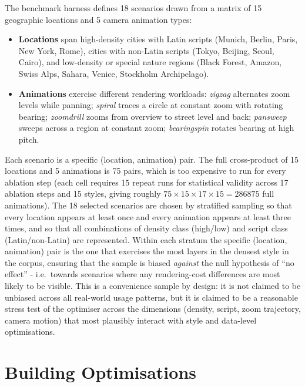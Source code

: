 The benchmark harness defines 18 scenarios drawn from a matrix of 15 geographic locations and 5 camera animation types:

\begin{itemize}
    \item \textbf{Locations} span high-density cities with Latin scripts (Munich, Berlin, Paris, New York, Rome), cities with non-Latin scripts (Tokyo, Beijing, Seoul, Cairo), and low-density or special nature regions (Black Forest, Amazon, Swiss Alps, Sahara, Venice, Stockholm Archipelago).
    \item \textbf{Animations} exercise different rendering workloads:
    \emph{zigzag} alternates zoom levels while panning;
    \emph{spiral} traces a circle at constant zoom with rotating bearing;
    \emph{zoomdrill} zooms from overview to street level and back;
    \emph{pansweep} sweeps across a region at constant zoom;
    \emph{bearingspin} rotates bearing at high pitch.
\end{itemize}

Each scenario is a specific (location, animation) pair.
The full cross-product of 15 locations and 5 animations is 75 pairs, which is too expensive to run for every ablation step (each cell requires 15 repeat runs for statistical validity across 17 ablation steps and 15 styles, giving roughly $75 \times 15 \times 17 \times 15 = \num{286875}$ full animations).
The 18 selected scenarios are chosen by stratified sampling so that every location appears at least once and every animation appears at least three times, and so that all combinations of density class (high/low) and script class (Latin/non-Latin) are represented.
Within each stratum the specific (location, animation) pair is the one that exercises the most layers in the densest style in the corpus, ensuring that the sample is biased \emph{against} the null hypothesis of \enquote{no effect} - i.e.\ towards scenarios where any rendering-cost differences are most likely to be visible.
This is a convenience sample by design:
it is not claimed to be unbiased across all real-world usage patterns, but it is claimed to be a reasonable stress test of the optimiser across the dimensions (density, script, zoom trajectory, camera motion) that most plausibly interact with style and data-level optimisations.

\section{Building Optimisations}\label{sec_building_optimisations}

